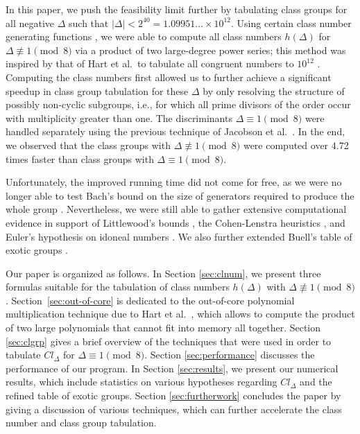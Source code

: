 \documentclass{mcom-l}
\theoremstyle{definition}
\begin{document}
In this paper, we push the feasibility limit further by tabulating
class groups for all negative $\Delta$ such that $|\Delta| < 2^{40} =
1.09951\ldots \times 10^{12}$. Using certain class number generating
functions \cite{watson}, we were able to compute all class numbers
$h(\Delta)$ for $\Delta \not \equiv 1 \pmod{8}$ via a product of two
large-degree power series; this method was inspired by that of Hart et
al.\ to tabulate all congruent numbers to $10^{12}$ \cite{hart}.
Computing the class numbers first allowed us to further achieve a
significant speedup in class group tabulation for these $\Delta$ by
only resolving the structure of possibly non-cyclic subgroups, i.e.,
for which all prime divisors of the order occur with multiplicity
greater than one.  The discriminants $\Delta \equiv 1 \pmod{8}$ were
handled separately using the previous technique of Jacobson et
al.\ \cite{jacobson}. In the end, we observed that the class groups
with $\Delta \not \equiv 1 \pmod{8}$ were computed over 4.72 times
faster than class groups with $\Delta \equiv 1 \pmod{8}.$

Unfortunately, the improved running time did not come for free, as we
were no longer able to test Bach's bound on the size of generators
required to produce the whole group \cite{bach1}. Nevertheless, we
were still able to gather extensive computational evidence in support
of Littlewood's bounds \cite{littlewood}, the Cohen-Lenstra heuristics
\cite{cohen2}, and Euler's hypothesis on idoneal numbers
\cite{kani}. We also further extended Buell's table of exotic groups
\cite{buell}.

Our paper is organized as follows. In Section \ref{sec:clnum}, we
present three formulas suitable for the tabulation of class numbers
$h(\Delta)$ with $\Delta \not \equiv 1
\pmod{8}$. Section~\ref{sec:out-of-core} is dedicated to the
out-of-core polynomial multiplication technique due to Hart et
al.\ \cite{hart}, which allows to compute the product of two large
polynomials that cannot fit into memory all together. Section
\ref{sec:clgrp} gives a brief overview of the techniques that were
used in order to tabulate $Cl_\Delta$ for $\Delta \equiv 1
\pmod{8}$. Section \ref{sec:performance} discusses the performance of our program.
In Section \ref{sec:results}, we present our numerical
results, which include statistics on various hypotheses regarding
$Cl_\Delta$ and the refined table of exotic groups. Section
\ref{sec:furtherwork} concludes the paper by giving a discussion of
various techniques, which can further accelerate the class number and
class group tabulation.
\end{document}

